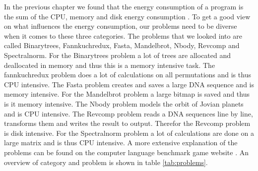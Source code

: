 
In the previous chapter we found that the energy consumption of a program is the sum of the CPU, memory and disk energy consumption \cite{acar2016impact}. To get a good view on what influences the energy consumption, our problems need to be diverse when it comes to these three categories. The problems that we looked into are called Binarytrees, Fannkuchredux, Fasta, Mandelbrot, Nbody, Revcomp and Spectralnorm. For the Binarytrees problem a lot of trees are allocated and deallocated in memory and thus this is a memory intensive task. The fannkuchredux problem does a lot of calculations on all permutations and is thus CPU intensive. The Fasta problem creates and saves a large DNA sequence and is memory intensive. For the Mandelbrot problem a large bitmap is saved and thus is it memory intensive. The Nbody problem models the orbit of Jovian planets and is CPU intensive. The Revcomp problem reads a DNA sequences line by line, transforms them and writes the result to output. Therefor the Revcomp problem is disk intensive. For the Spectralnorm problem a lot of calculations are done on a large matrix and is thus CPU intensive. A more extensive explanation of the problems can be found on the computer language benchmark game website \cite{gouy:2019}. An overview of category and problem is shown in table \ref{tab:problems}.

